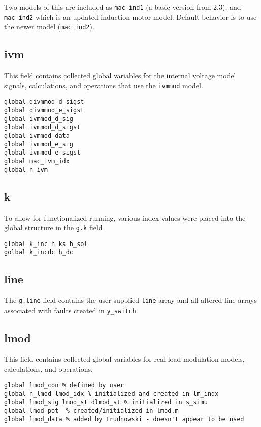 Two models of this are included as \verb|mac_ind1| (a basic version from 2.3), and \verb|mac_ind2| which is an updated induction motor model. Default behavior is to use the newer model (\verb|mac_ind2|).

\subsection{ivm} 
This field contains collected global variables for the internal voltage model signals, calculations, and operations that use the \verb|ivmmod| model.
\begin{verbatim}
global divmmod_d_sigst
global divmmod_e_sigst
global ivmmod_d_sig
global ivmmod_d_sigst
global ivmmod_data
global ivmmod_e_sig
global ivmmod_e_sigst
global mac_ivm_idx
global n_ivm
\end{verbatim}

\subsection{k}  
To allow for functionalized running, various index values were placed into the global structure in the \verb|g.k| field

\begin{verbatim}
global k_inc h ks h_sol
golbal k_incdc h_dc
\end{verbatim}

\subsection{line}  
The \verb|g.line| field contains the user supplied \verb|line| array and all altered line arrays associated with faults created in \verb|y_switch|.

\subsection{lmod}
This field contains collected global variables for real load modulation models, calculations, and operations.
\begin{verbatim}
global lmod_con % defined by user
global n_lmod lmod_idx % initialized and created in lm_indx
global lmod_sig lmod_st dlmod_st % initialized in s_simu
global lmod_pot  % created/initialized in lmod.m 
global lmod_data % added by Trudnowski - doesn't appear to be used
\end{verbatim}

